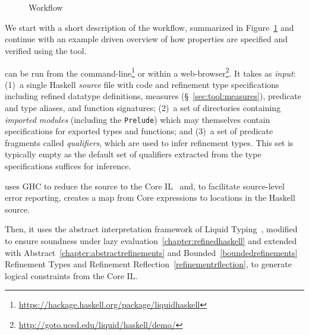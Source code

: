\section{\toolname}\label{sec:liquidhaskell}
\begin{figure}[t!]
\centering
\captionsetup{justification=centering}
\noindent{}
\caption{\toolname Workflow}
	\label{fig:internals}
\end{figure}
% 
%
We start with a short description of the \toolname workflow,
summarized in Figure~\ref{fig:internals} and continue with an 
example driven overview of how properties are specified
and verified using the tool. 

\toolname can be run from the command-line\footnote{\url{https://hackage.haskell.org/package/liquidhaskell}}
or within a web-browser\footnote{\url{http://goto.ucsd.edu/liquid/haskell/demo/}}.
It takes as \emph{input}:
%
(1)~a single Haskell \emph{source} file with code and refinement
    type specifications including refined datatype definitions, 
    measures (\S~\ref{sec:tool:measures}), predicate and type 
    aliases, and function signatures;
%
(2)~a set of directories containing \emph{imported modules} 
    (including the \verb+Prelude+) which may themselves 
    contain specifications for exported types and functions; and
%
(3)~a set of predicate fragments called \emph{qualifiers},
    which are used to infer refinement types. This set is 
    typically empty as the default set of qualifiers extracted 
    from the type specifications suffices for inference.

\toolname uses GHC to reduce the source to the Core IL~\cite{SulzmannCJD07}
and, to facilitate source-level error reporting, creates a map from Core 
expressions to locations in the Haskell source.

Then, it uses the abstract interpretation framework of Liquid Typing~\cite{LiquidPLDI08}, 
modified to ensure soundness under lazy evaluation~\ref{chapter:refinedhaskell}
and extended with Abstract~\ref{chapter:abstractrefinements}
and Bounded~\ref{boundedrefinements} Refinement Types
and Refinement Reflection~\ref{refinementrflection},
to generate logical constraints from the Core IL.
     
